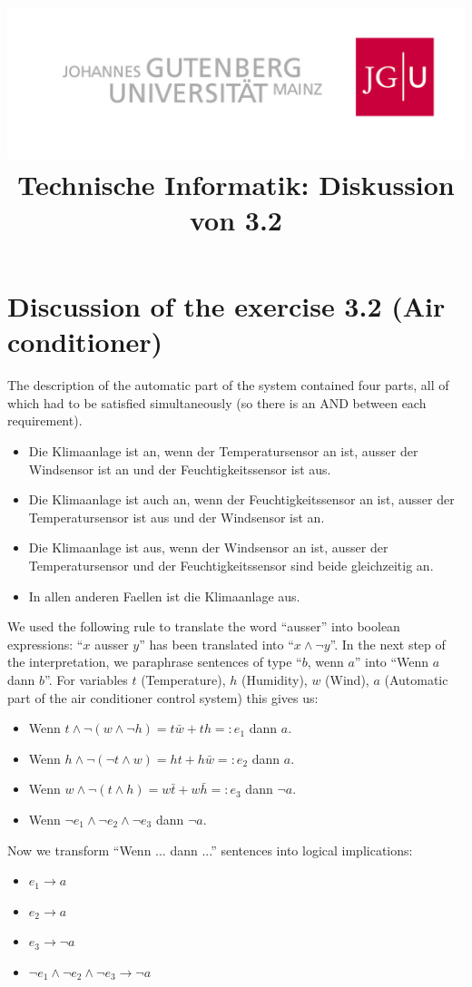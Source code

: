 \documentclass[10pt,a4paper]{scrartcl}
\title{\includegraphics[scale=0.2]{../logo_schriftzug}\\
Technische Informatik: Diskussion von 3.2}
\renewcommand{\implies}{\rightarrow}
\begin{document}
\maketitle
\section*{Discussion of the exercise 3.2 (Air conditioner)}
The description of the automatic part of the system contained four parts, all of which had to
be satisfied simultaneously (so there is an AND between each requirement).
\begin{itemize}
  \item Die Klimaanlage ist an, wenn der Temperatursensor an ist, ausser der Windsensor ist an und der
     Feuchtigkeitssensor ist aus.
  \item Die Klimaanlage ist auch an, wenn der Feuchtigkeitssensor an ist, ausser der Temperatursensor ist
     aus und der Windsensor ist an.
  \item Die Klimaanlage ist aus, wenn der Windsensor an ist, ausser der Temperatursensor und der
     Feuchtigkeitssensor sind beide gleichzeitig an.
  \item In allen anderen Faellen ist die Klimaanlage aus.
\end{itemize}
We used the following rule to translate the word ``ausser'' into boolean expressions: ``$x$ ausser $y$''
has been translated into ``$x \wedge \neg y$''. In the next step of the interpretation, we paraphrase 
sentences of type ``$b$, wenn $a$'' into ``Wenn $a$ dann $b$''. For variables $t$ (Temperature), $h$ (Humidity), $w$ (Wind), $a$ (Automatic part of the air conditioner control system) this gives us:
\begin{itemize}
  \item Wenn $t \wedge \neg (w \wedge \neg h) = t\bar w + t h =: e_1$ dann $a$.
  \item Wenn $h \wedge \neg (\neg t \wedge w) = h t + h \bar w =: e_2$ dann $a$.
  \item Wenn $w \wedge \neg (t \wedge h) = w \bar t + w \bar h =: e_3$ dann $\neg a$.
  \item Wenn $\neg e_1 \wedge \neg e_2 \wedge \neg e_3$ dann $\neg a$.
\end{itemize}
Now we transform ``Wenn ... dann ...'' sentences into logical implications:
\begin{itemize}
  \item $e_1 \implies a$
  \item $e_2 \implies a$
  \item $e_3 \implies \neg a$
  \item $\neg e_1 \wedge \neg e_2 \wedge \neg e_3 \implies \neg a$
\end{itemize}
\end{document}
